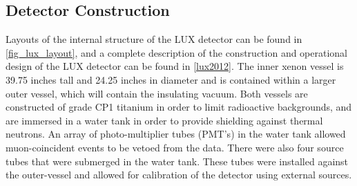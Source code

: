 \subsection{Detector Construction}
Layouts of the internal structure of the LUX detector can be found in \ref{fig_lux_layout}, and a complete description of the construction and operational design of the LUX detector can be found in \ref{lux2012}. The inner xenon vessel is 39.75 inches tall and 24.25 inches in diameter and is contained within a larger outer vessel, which will contain the insulating vacuum. Both vessels are constructed of grade CP1 titanium in order to limit radioactive backgrounds, and are immersed in a water tank in order to provide shielding against thermal neutrons. An array of photo-multiplier tubes (PMT's) in the water tank allowed muon-coincident events to be vetoed from the data. There were also four source tubes that were submerged in the water tank. These tubes were installed against the outer-vessel and allowed for calibration of the detector using external sources.
